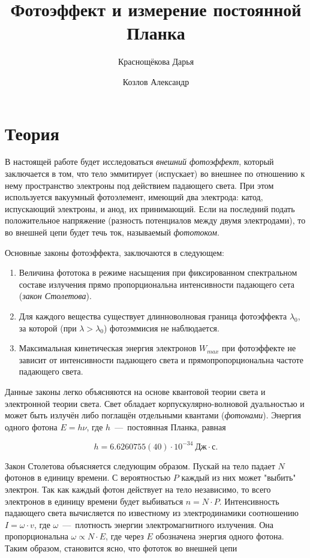 \documentclass[12pt]{article}
\title{Фотоэффект и измерение постоянной Планка}
\author{Краснощёкова Дарья \and Козлов Александр}
\begin{document}
	\maketitle

	\section{Теория} %
	\label{sec:theory}
	В настоящей работе будет исследоваться \emph{внешний фотоэффект}, который заключается в том, что тело эммитирует (испускает) во внешнее по отношению к нему пространство электроны под действием падающего света. При этом используется вакуумный фотоэлемент, имеющий два электрода: катод, испускающий электроны, и анод, их принимающий. Если на последний подать положительное напряжение (разность потенциалов между двумя электродами), то во внешней цепи будет течь ток, называемый \emph{фототоком}.

	\par Основные законы фотоэффекта, заключаются в следующем:
	\begin{enumerate}
		\item Величина фототока в режиме насыщения при фиксированном спектральном составе излучения прямо пропорциональна интенсивности падающего сета (\emph{закон Столетова}).

		\item Для каждого вещества существует длинноволновая граница фотоэффекта $\lambda_0$, за которой (при $\lambda > \lambda_0$) фотоэммисия не наблюдается.

		\item Максимальная кинетическая энергия электронов $W_{max}$ при фотоэффекте не зависит от интенсивности падающего света и прямопропорциональна частоте падающего света.
	\end{enumerate}

	Данные законы легко объясняются на основе квантовой теории света и электронной теории света. Свет обладает корпускулярно\--волновой дуальностью и может быть излучён либо поглащён отдельными квантами (\emph{фотонами}). Энергия одного фотона 
	$E = h \nu$, где $h$~\----~постоянная Планка, равная 

	\[
	h = 6.6260755(40)\cdot 10^{-34}\ \text{Дж}\cdot\text{с}.
	\]

	\par Закон Столетова объясняется следующим образом. Пускай на тело падает $N$ фотонов в единицу времени. С вероятностью $P$ каждый из них может "{}выбить"{} электрон. Так как каждый фотон действует на тело независимо, то всего электронов в единицу времени будет выбиваться $n = N\cdot P$. Интенсивность падающего света вычисляется по известному из электродинамики соотношению $I = \omega\cdot v$, где $\omega$~\----~плотность энергии электромагнитного излучения. Она пропорциональна 
	$\omega \propto N \cdot E$, где через $E$ обозначена энергия одного фотона. Таким образом, становится ясно, что фототок во внешней цепи 
\end{document}
